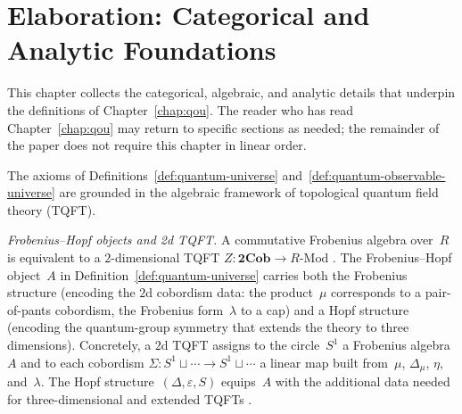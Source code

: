 \chapter{Elaboration: Categorical and Analytic Foundations}
\label{chap:elaboration}

This chapter collects the categorical, algebraic, and analytic details
that underpin the definitions of Chapter~\ref{chap:qou}.  The reader
who has read Chapter~\ref{chap:qou} may return to specific sections as
needed; the remainder of the paper does not require this chapter in
linear order.

\begin{remark}
\label{rem:tqft-context}
The axioms of
Definitions~\ref{def:quantum-universe}
and~\ref{def:quantum-observable-universe} are grounded in the algebraic
framework of topological quantum field theory (TQFT).

\medskip\noindent\textit{Frobenius--Hopf objects and 2d TQFT.}\;
A commutative Frobenius algebra over~$R$ is equivalent to a
$2$-dimensional TQFT
$Z \colon \mathbf{2Cob} \to R\text{-}\mathrm{Mod}$
\cite{kock2004, atiyah1988}.  The Frobenius--Hopf object~$A$ in
Definition~\ref{def:quantum-universe} carries both the Frobenius structure
(encoding the $2$d cobordism data: the product~$\mu$ corresponds to a
pair-of-pants cobordism, the Frobenius form~$\lambda$ to a cap) and a
Hopf structure (encoding the quantum-group symmetry that extends the theory
to three dimensions).  Concretely, a $2$d TQFT assigns to
the circle~$S^1$ a Frobenius algebra~$A$ and to each cobordism
$\Sigma \colon S^1 \sqcup \cdots \to S^1 \sqcup \cdots$ a linear map
built from~$\mu$, $\Delta_\mu$, $\eta$, and~$\lambda$.  The Hopf
structure~$(\Delta, \varepsilon, S)$ equips~$A$ with the additional data
needed for three-dimensional and extended TQFTs
\cite{turaev2010, witten1988}.


\end{remark}
